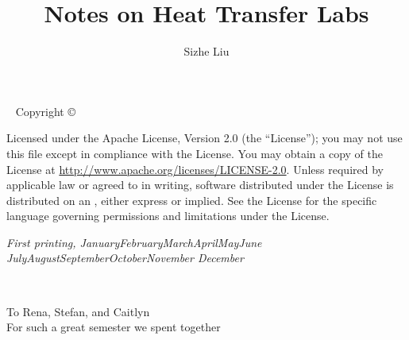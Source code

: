 \documentclass[notoc,numbers,openany,UTF8]{tufte-book}
\title{Notes on Heat Transfer Labs}
\author[Sizhe Liu]{Sizhe Liu}
\newcommand{\monthyear}{%
  \ifcase\month\or January\or February\or March\or April\or May\or June\or
  July\or August\or September\or October\or November\or
  December\fi\space\number\year
}
\begin{document}
\frontmatter
\maketitle

\newpage
\begin{fullwidth}
~\vfill
\thispagestyle{empty}
\setlength{\parindent}{0pt}
\setlength{\parskip}{\baselineskip}
Copyright \copyright\ \the\year\ \thanklessauthor



\par Licensed under the Apache License, Version 2.0 (the ``License''); you may not
use this file except in compliance with the License. You may obtain a copy
of the License at \url{http://www.apache.org/licenses/LICENSE-2.0}. Unless
required by applicable law or agreed to in writing, software distributed
under the License is distributed on an , either express or implied. See the
License for the specific language governing permissions and limitations
under the License.

\par\textit{First printing, \monthyear}
\end{fullwidth}

\begin{fullwidth}
\tableofcontents

\listoffigures

\listoftables
\end{fullwidth}

\cleardoublepage
\markboth{}{}
~\vfill
\begin{doublespace}
\noindent\fontsize{18}{22}\selectfont\itshape
\nohyphenation
\begin{fullwidth}
To Rena, Stefan, and Caitlyn\\
For such a great semester we spent together
\end{fullwidth}
\end{doublespace}
\vfill
\vfill


\mainmatter





\backmatter

\printindex
\end{document}

